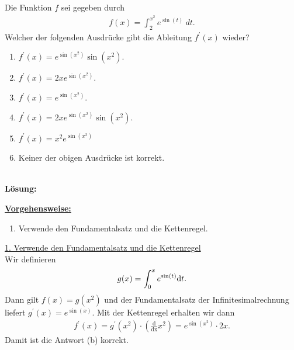 \subsection*{}
Die Funktion $ f $ sei gegeben durch
\begin{align*}
	f(x) = \int_2^{x^2} e^{\sin(t)} \ dt.
\end{align*}
Welcher der folgenden Ausdrücke gibt die Ableitung $ f^\prime(x) $ wieder?
\renewcommand{\labelenumi}{(\alph{enumi})}
\begin{enumerate}
	\item 
	$ f^\prime(x) = e^{\sin(x^2)} \sin(x^2)$.
	\item 
	$ f^\prime(x) = 2 x e^{\sin(x^2)}$.
	\item 
	$ f^\prime(x) = e^{\sin(x^2)}$.
	\item
	$ f^\prime(x) = 2 x e^{\sin(x^2)} \sin(x^2)$.
	\item 
	$ f^\prime(x) = x^2 e^{\sin(x^2)}$ 
	\item 
	Keiner der obigen Ausdrücke ist korrekt.
\end{enumerate}
\ \\
\textbf{Lösung:}
\begin{mdframed}
\underline{\textbf{Vorgehensweise:}}
\renewcommand{\labelenumi}{\theenumi.}
\begin{enumerate}
\item Verwende den Fundamentalsatz und die Kettenregel.
\end{enumerate}
\end{mdframed}

\underline{1. Verwende den Fundamentalsatz und die Kettenregel}\\
Wir definieren 
\begin{align*}
	g(x) = 
	\int_0^x e^{\sin(t)} \text{\rmfamily d} t.
\end{align*}
Dann gilt $ f(x)  = g(x^2)$ und der Fundamentalsatz der Infinitesimalrechnung liefert $ g^\prime(x) = e^{\sin(x)} $.
Mit der Kettenregel erhalten wir dann
\begin{align*}
	f^\prime(x) = g^\prime(x^2) \cdot \left(\frac{\mathrm{d}}{\mathrm{dx}} x^2\right)
	=
	e^{\sin(x^2)} \cdot 2x.
\end{align*}
Damit ist die Antwort (b) korrekt.

\newpage

